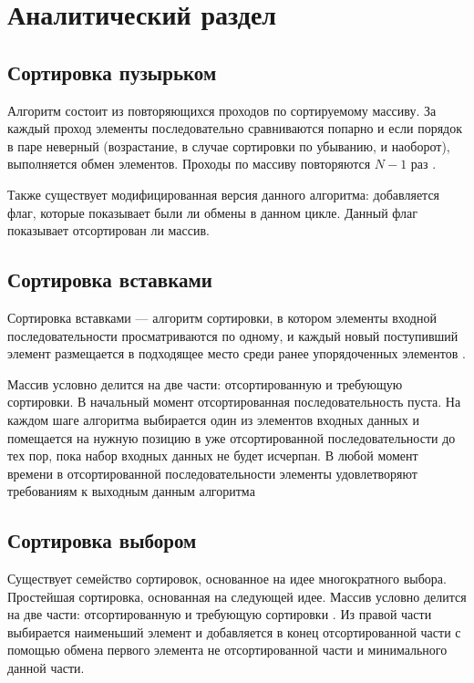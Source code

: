 \chapter{Аналитический раздел}\label{analyth}

\section{Сортировка пузырьком}

Алгоритм состоит из повторяющихся проходов по сортируемому массиву. За каждый проход элементы последовательно сравниваются попарно и если порядок в паре неверный (возрастание, в случае сортировки по убыванию, и наоборот), выполняется обмен элементов. Проходы по массиву повторяются $N−1$ раз \cite{knut}.  

Также существует модифицированная версия данного алгоритма: добавляется флаг, которые показывает были ли обмены в данном цикле. Данный флаг показывает отсортирован ли массив.

\section{Сортировка вставками}

Сортировка вставками — алгоритм сортировки, в котором элементы входной последовательности просматриваются по одному, и каждый новый поступивший элемент размещается в подходящее место среди ранее упорядоченных элементов \cite{knut}.

Массив условно делится на две части: отсортированную и требующую сортировки. В начальный момент отсортированная последовательность пуста. На каждом шаге алгоритма выбирается один из элементов входных данных и помещается на нужную позицию в уже отсортированной последовательности до тех пор, пока набор входных данных не будет исчерпан. В любой момент времени в отсортированной последовательности элементы удовлетворяют требованиям к выходным данным алгоритма

\section{Сортировка выбором}

Существует семейство сортировок, основанное на идее многократного выбора. Простейшая сортировка, основанная на следующей идее. Массив условно делится на две части: отсортированную и требующую сортировки \cite{knut}.
Из правой части выбирается наименьший элемент и добавляется в конец отсортированной части с помощью обмена первого элемента не отсортированной части и минимального данной части.

